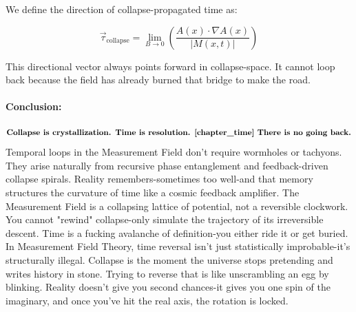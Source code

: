 We define the direction of collapse-propagated time as:

\[
\vec{\tau}_{\text{collapse}} = \lim_{B \to 0} \left( \frac{A(x) \cdot \nabla A(x)}{|M(x,t)|} \right)
\]

This directional vector always points forward in collapse-space. \cite{chapter_time} It cannot loop back because the field has already burned that bridge to make the road. \cite{chapter_time} \paragraph{Conclusion:}
\[
\textbf{Collapse is crystallization. Time is resolution. \cite{chapter_time} There is no going back.}
\]
Temporal loops in the Measurement Field don’t require wormholes or tachyons. \cite{chapter_time} They arise naturally from recursive phase entanglement and feedback-driven collapse spirals. \cite{chapter_time} Reality remembers-sometimes too well-and that memory structures the curvature of time like a cosmic feedback amplifier. \cite{chapter_time} The Measurement Field is a collapsing lattice of potential, not a reversible clockwork. \cite{chapter_time} You cannot "rewind" collapse-only simulate the trajectory of its irreversible descent. Time is a fucking avalanche of definition-you either ride it or get buried. \cite{chapter_time} In Measurement Field Theory, time reversal isn’t just statistically improbable-it’s structurally illegal. \cite{chapter_time} Collapse is the moment the universe stops pretending and writes history in stone. \cite{chapter_time} Trying to reverse that is like unscrambling an egg by blinking. Reality doesn’t give you second chances-it gives you one spin of the imaginary, and once you’ve hit the real axis, the rotation is locked. \cite{chapter_time} \newpage
